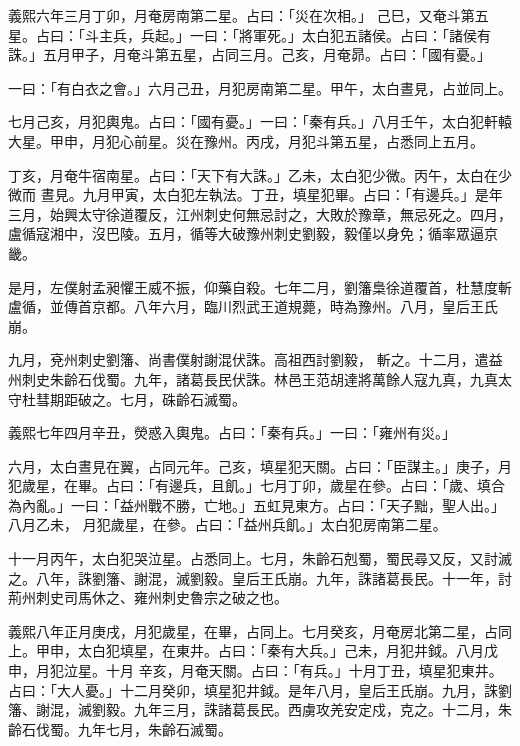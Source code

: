 \begin{pinyinscope}
 義熙六年三月丁卯，月奄房南第二星。占曰：「災在次相。」
 己巳，又奄斗第五星。占曰：「斗主兵，兵起。」一曰：「將軍死。」太白犯五諸侯。占曰：「諸侯有誅。」五月甲子，月奄斗第五星，占同三月。己亥，月奄昴。占曰：「國有憂。」



 一曰：「有白衣之會。」六月己丑，月犯房南第二星。甲午，太白晝見，占並同上。



 七月己亥，月犯輿鬼。占曰：「國有憂。」一曰：「秦有兵。」八月壬午，太白犯軒轅大星。甲申，月犯心前星。災在豫州。丙戌，月犯斗第五星，占悉同上五月。



 丁亥，月奄牛宿南星。占曰：「天下有大誅。」乙未，太白犯少微。丙午，太白在少微而
 晝見。九月甲寅，太白犯左執法。丁丑，填星犯畢。占曰：「有邊兵。」是年三月，始興太守徐道覆反，江州刺史何無忌討之，大敗於豫章，無忌死之。四月，盧循寇湘中，沒巴陵。五月，循等大破豫州刺史劉毅，毅僅以身免；循率眾逼京畿。



 是月，左僕射孟昶懼王威不振，仰藥自殺。七年二月，劉籓梟徐道覆首，杜慧度斬盧循，並傳首京都。八年六月，臨川烈武王道規薨，時為豫州。八月，皇后王氏崩。



 九月，兗州刺史劉籓、尚書僕射謝混伏誅。高祖西討劉毅，
 斬之。十二月，遣益州刺史朱齡石伐蜀。九年，諸葛長民伏誅。林邑王范胡達將萬餘人寇九真，九真太守杜彗期距破之。七月，硃齡石滅蜀。



 義熙七年四月辛丑，熒惑入輿鬼。占曰：「秦有兵。」一曰：「雍州有災。」



 六月，太白晝見在翼，占同元年。己亥，填星犯天關。占曰：「臣謀主。」庚子，月犯歲星，在畢。占曰：「有邊兵，且飢。」七月丁卯，歲星在參。占曰：「歲、填合為內亂。」一曰：「益州戰不勝，亡地。」五虹見東方。占曰：「天子黜，聖人出。」八月乙未，
 月犯歲星，在參。占曰：「益州兵飢。」太白犯房南第二星。



 十一月丙午，太白犯哭泣星。占悉同上。七月，朱齡石剋蜀，蜀民尋又反，又討滅之。八年，誅劉籓、謝混，滅劉毅。皇后王氏崩。九年，誅諸葛長民。十一年，討荊州刺史司馬休之、雍州刺史魯宗之破之也。



 義熙八年正月庚戌，月犯歲星，在畢，占同上。七月癸亥，月奄房北第二星，占同上。甲申，太白犯填星，在東井。占曰：「秦有大兵。」己未，月犯井鉞。八月戊申，月犯泣星。十月
 辛亥，月奄天關。占曰：「有兵。」十月丁丑，填星犯東井。占曰：「大人憂。」十二月癸卯，填星犯井鉞。是年八月，皇后王氏崩。九月，誅劉籓、謝混，滅劉毅。九年三月，誅諸葛長民。西虜攻羌安定戍，克之。十二月，朱齡石伐蜀。九年七月，朱齡石滅蜀。




\end{pinyinscope}
